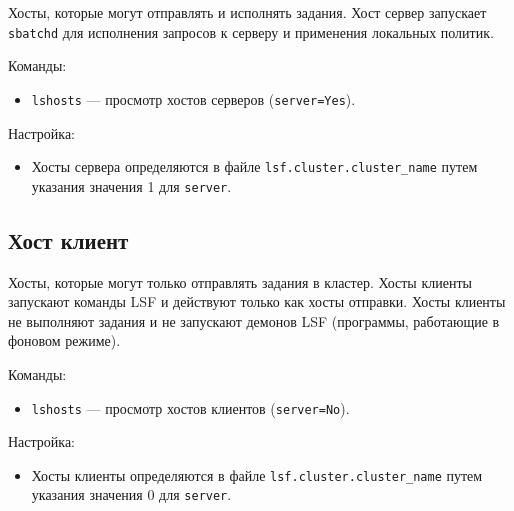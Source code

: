 Хосты, которые могут отправлять и исполнять задания. Хост сервер запускает \lstinline{sbatchd} для исполнения запросов к серверу и применения локальных политик.

Команды:

\begin{itemize}
    \item \lstinline{lshosts} --- просмотр хостов серверов (\lstinline{server=Yes}).
\end{itemize}

Настройка:

\begin{itemize}
    \item Хосты сервера определяются в файле \lstinline{lsf.cluster.cluster_name} путем указания значения 1 для \lstinline{server}.
\end{itemize}


\subsection{Хост клиент}

Хосты, которые могут только отправлять задания в кластер. Хосты клиенты запускают команды LSF и действуют только как хосты отправки. Хосты клиенты не выполняют задания и не запускают демонов LSF (программы, работающие в фоновом режиме).

Команды:

\begin{itemize}
    \item \lstinline{lshosts} --- просмотр хостов клиентов (\lstinline{server=No}).
\end{itemize}

Настройка:

\begin{itemize}
    \item Хосты клиенты определяются в файле \lstinline{lsf.cluster.cluster_name} путем указания значения 0 для \lstinline{server}.
\end{itemize}


